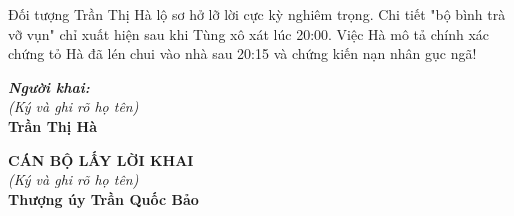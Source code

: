 \documentclass[12pt,a4paper]{article}
\begin{document}
\begin{tcolorbox}[colback=red!5!white,colframe=red!75!black,title=\textbf{NHẬN XÉT CỦA ĐIỀU TRA VIÊN (GHI CHÚ BIÊN BẢN)}]
Đối tượng Trần Thị Hà lộ sơ hở lỡ lời cực kỳ nghiêm trọng. Chi tiết "bộ bình trà vỡ vụn" chỉ xuất hiện sau khi Tùng xô xát lúc 20:00. Việc Hà mô tả chính xác chứng tỏ Hà đã lén chui vào nhà sau 20:15 và chứng kiến nạn nhân gục ngã!
\end{tcolorbox}

\vspace{0.8cm}

\noindent
\begin{minipage}[t]{0.45\textwidth}
    \textbf{\textit{Người khai:}}\\
    \textit{(Ký và ghi rõ họ tên)}\\[1.5cm]
    \textbf{Trần Thị Hà}
\end{minipage}
\hfill
\begin{minipage}[t]{0.5\textwidth}
    \begin{center}
        \textbf{CÁN BỘ LẤY LỜI KHAI}\\
        \textit{(Ký và ghi rõ họ tên)}\\[1.5cm]
        \textbf{Thượng úy Trần Quốc Bảo}
    \end{center}
\end{minipage}
\end{document}
